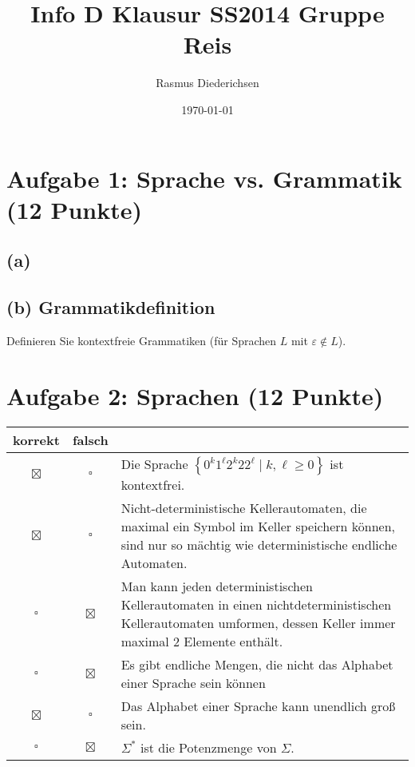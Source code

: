 \documentclass{scrartcl}
\title{Info D Klausur SS2014 Gruppe Reis}
\author{Rasmus Diederichsen}
\date{\today}
\begin{document}
\section*{Aufgabe 1: Sprache vs. Grammatik \hfill (12 Punkte)} 

\subsection*{(a)} 

\subsection*{(b) Grammatikdefinition \hfill{} } 
Definieren Sie kontextfreie Grammatiken (für Sprachen $L$ mit
\vspace{\baselineskip}
$\varepsilon\not\in L$).

\begin{center}
   \noindent{}
\end{center}

\section*{Aufgabe 2: Sprachen \hfill{} (12 Punkte)}

\newcommand{\mpsol}{\colorbox{lightgray!20}{$\boxtimes$}}
\renewcommand{\mp}{\colorbox{lightgray!20}{$\square$}}

\renewcommand{\arraystretch}{1.4}
\begin{tabularx}{\textwidth}{ccX}
   korrekt & falsch & \\ \hline
   \mpsol & \mp & Die Sprache $\left\{0^k1^\ell2^k22^\ell \mid k,\ell\ge 0\right\}$ ist kontextfrei.\\
   \mpsol & \mp & Nicht-deterministische Kellerautomaten, die maximal ein Symbol im Keller
   speichern können, sind nur so mächtig wie deterministische
   endliche Automaten. \\
   \mp & \mpsol & Man kann jeden deterministischen Kellerautomaten in einen
   nichtdeterministischen Kellerautomaten umformen, dessen Keller immer maximal 2
   Elemente enthält.\\
   \mp & \mpsol & Es gibt endliche Mengen, die nicht das Alphabet einer Sprache
   sein können \\
   \mpsol & \mp & Das Alphabet einer Sprache kann unendlich groß sein.\\
   \mp & \mpsol & $\Sigma^*$ ist die Potenzmenge von $\Sigma$.
\end{tabularx}
\end{document}
